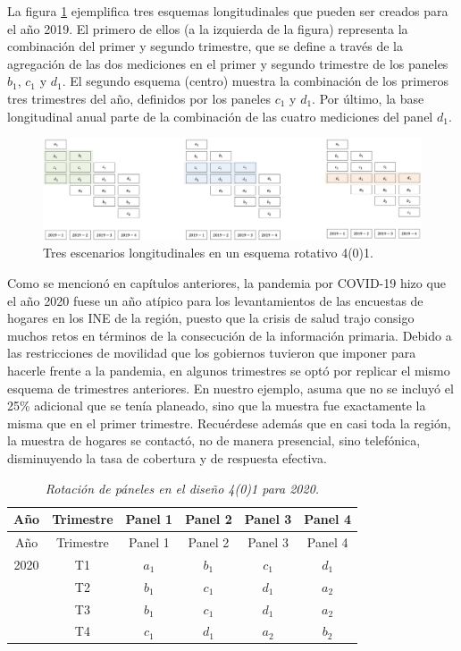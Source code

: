 \documentclass[
  12pt,
  spanish,
]{book}
\begin{document}
La figura \ref{fig:figel1} ejemplifica tres esquemas longitudinales que pueden ser creados para el año 2019. El primero de ellos (a la izquierda de la figura) representa la combinación del primer y segundo trimestre, que se define a través de la agregación de las dos mediciones en el primer y segundo trimestre de los paneles \(b_1\), \(c_1\) y \(d_1\). El segundo esquema (centro) muestra la combinación de los primeros tres trimestres del año, definidos por los paneles \(c_1\) y \(d_1\). Por último, la base longitudinal anual parte de la combinación de las cuatro mediciones del panel \(d_1\).

\begin{figure}
\includegraphics[width=0.5\linewidth]{Pics/el1} \caption{Tres escenarios longitudinales en un esquema rotativo 4(0)1.}\label{fig:figel1}
\end{figure}

Como se mencionó en capítulos anteriores, la pandemia por COVID-19 hizo que el año 2020 fuese un año atípico para los levantamientos de las encuestas de hogares en los INE de la región, puesto que la crisis de salud trajo consigo muchos retos en términos de la consecución de la información primaria. Debido a las restricciones de movilidad que los gobiernos tuvieron que imponer para hacerle frente a la pandemia, en algunos trimestres se optó por replicar el mismo esquema de trimestres anteriores. En nuestro ejemplo, asuma que no se incluyó el 25\% adicional que se tenía planeado, sino que la muestra fue exactamente la misma que en el primer trimestre. Recuérdese además que en casi toda la región, la muestra de hogares se contactó, no de manera presencial, sino telefónica, disminuyendo la tasa de cobertura y de respuesta efectiva.

\begin{longtable}[]{@{}cccccc@{}}
\caption{\emph{Rotación de páneles en el diseño 4(0)1 para 2020.}}\tabularnewline
\toprule
Año & Trimestre & Panel 1 & Panel 2 & Panel 3 & Panel 4 \\
\midrule
\endfirsthead
\toprule
Año & Trimestre & Panel 1 & Panel 2 & Panel 3 & Panel 4 \\
\midrule
\endhead
2020 & T1 & \(a_1\) & \(b_1\) & \(c_1\) & \(d_1\) \\
& T2 & \(b_1\) & \(c_1\) & \(d_1\) & \(a_2\) \\
& T3 & \(b_1\) & \(c_1\) & \(d_1\) & \(a_2\) \\
& T4 & \(c_1\) & \(d_1\) & \(a_2\) & \(b_2\) \\
\bottomrule
\end{longtable}
\end{document}

